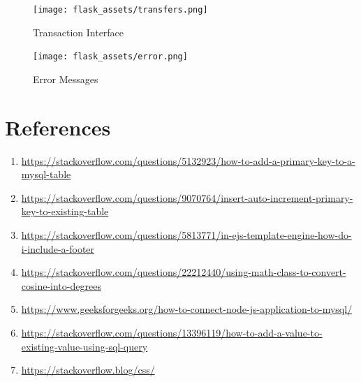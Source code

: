\begin{figure}[h]
    \centering
    \texttt{[image: flask\_assets/transfers.png]}
    \caption{Transaction Interface}
\end{figure}

\begin{figure}[h]
    \centering
    \texttt{[image: flask\_assets/error.png]}
    \caption{Error Messages}
\end{figure}

\chapter{References}

\begin{enumerate}
    \item \raggedright \url{https://stackoverflow.com/questions/5132923/how-to-add-a-primary-key-to-a-mysql-table}
    \item \raggedright \url{https://stackoverflow.com/questions/9070764/insert-auto-increment-primary-key-to-existing-table}
    \item \raggedright \url{https://stackoverflow.com/questions/5813771/in-ejs-template-engine-how-do-i-include-a-footer}
    \item \raggedright \url{https://stackoverflow.com/questions/22212440/using-math-class-to-convert-cosine-into-degrees}
    \item \raggedright \url{https://www.geeksforgeeks.org/how-to-connect-node-js-application-to-mysql/}
    \item \raggedright \url{https://stackoverflow.com/questions/13396119/how-to-add-a-value-to-existing-value-using-sql-query}
    \item \raggedright \url{https://stackoverflow.blog/css/}
\end{enumerate}

